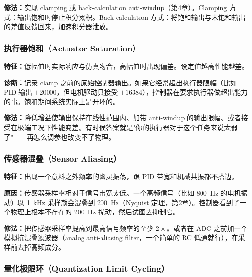 \textbf{修法：}实现 clamping 或 back-calculation anti-windup（第4章）。Clamping 方式：输出饱和时停止积分累积。Back-calculation 方式：将饱和输出与未饱和输出的差值反馈回来，加速积分器泄放。

\subsubsection{执行器饱和（Actuator Saturation）}

\textbf{特征：}低幅值时实际响应与仿真吻合，高幅值时出现偏差。设定值越高性能越差。

\textbf{诊断：}记录 clamp 之前的原始控制器输出。如果它经常超出执行器限幅（比如 PID 输出 $\pm 20000$，但电机驱动只接受 $\pm 16384$），控制器在要求执行器做超出能力的事。饱和期间系统实际上是开环的。

\textbf{修法：}降低增益使输出保持在线性范围内、加带 anti-windup 的输出限幅、或者接受在极端工况下性能变差。有时候答案就是"你的执行器对于这个任务来说太弱了"——再怎么调参也改变不了物理。

\subsubsection{传感器混叠（Sensor Aliasing）}

\textbf{特征：}出现一个意料之外频率的幽灵振荡，跟 PID 带宽和机械共振都不搭边。

\textbf{原因：}传感器采样率相对于信号带宽太低。一个高频信号（比如 800~Hz 的电机振动）以 1~kHz 采样就会混叠到 200~Hz（Nyquist 定理，第2章）。控制器看到了一个物理上根本不存在的 200~Hz 扰动，然后试图去抑制它。

\textbf{修法：}把传感器采样率提高到最高信号频率的至少 $2\times$。或者在 ADC 之前加一个模拟抗混叠滤波器（analog anti-aliasing filter，一个简单的 RC 低通就行），在采样前去掉高频成分。

\subsubsection{量化极限环（Quantization Limit Cycling）}

